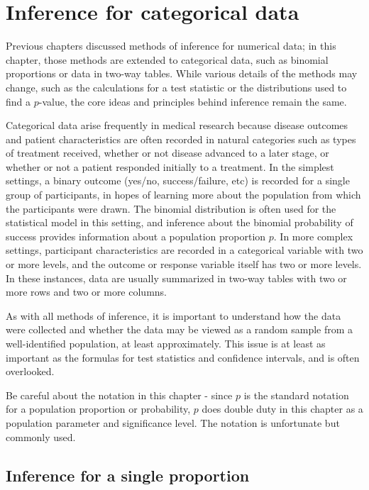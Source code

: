 
\chapter{Inference for categorical data}
\label{inferenceForCategoricalData}

Previous chapters discussed methods of inference for numerical data; in this chapter, those methods are extended to categorical data, such as binomial proportions or data in two-way tables. While various details of the methods may change, such as the calculations for a test statistic or the distributions used to find a $p$-value, the core ideas and principles behind inference remain the same.  

Categorical data arise frequently in medical research because disease outcomes and patient characteristics are often recorded in natural categories such as types of treatment received, whether or not disease advanced to a later stage, or whether or not a patient responded initially to a treatment. In the simplest settings, a binary outcome (yes/no, success/failure, etc)  is recorded for a single group of participants, in hopes of learning more about the population from which the participants were drawn.  The binomial distribution is often used for the statistical model in this setting, and inference about the binomial probability of success provides information about a population proportion $p$.   In more complex settings, participant characteristics are recorded in a categorical variable with two or more levels, and the outcome or response variable itself has two or more levels.  In these instances, data are usually summarized in two-way tables with two or more rows and two or more columns.

As  with all methods of inference, it is important to understand how the data were collected and whether the data may be viewed as a random sample from a well-identified population, at least approximately.  This issue is at least as important as the formulas for test statistics and confidence intervals, and is often overlooked.

Be careful about the notation in this chapter - since $p$ is the standard notation for a population proportion or probability, $p$ does double duty in this chapter as a population parameter and significance level.  The notation is unfortunate but commonly used.

\section{Inference for a single proportion}
\label{singleProportion}

